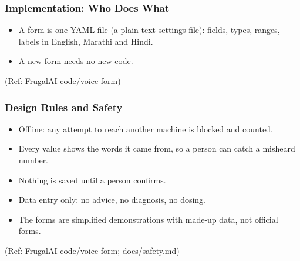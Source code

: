 \begin{frame}[fragile]\frametitle{Implementation: Who Does What}
\begin{center}
\scriptsize
{}
\end{center}
\begin{itemize}
\item A form is one YAML file (a plain text settings file): fields, types, ranges, labels in English, Marathi and Hindi.
\item A new form needs no new code.
\end{itemize}
{\tiny (Ref: FrugalAI code/voice-form)}
\end{frame}

\begin{frame}[fragile]\frametitle{Design Rules and Safety}
\begin{itemize}
\item Offline: any attempt to reach another machine is blocked and counted.
\item Every value shows the words it came from, so a person can catch a misheard number.
\item Nothing is saved until a person confirms.
\item Data entry only: no advice, no diagnosis, no dosing.
\item The forms are simplified demonstrations with made-up data, not official forms.
\end{itemize}
{\tiny (Ref: FrugalAI code/voice-form; docs/safety.md)}
\end{frame}
